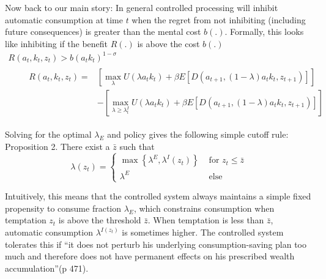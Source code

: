 \documentclass{article}
\begin{document}
Now back to our main story: In general controlled processing will inhibit automatic consumption at time $t$ when the regret from not inhibiting (including future consequences) is greater than the mental cost $b(.)$.  Formally, this looks like inhibiting if the benefit $R(.)$ is above the cost $b(.)$
\begin{equation*}
	\begin{array}{l}
	R\left(a_{t}, k_{t}, z_{t}\right)>b\left(a_{t} k_{t}\right)^{1-\sigma} \\
	\qquad \begin{aligned}
	R\left(a_{t}, k_{t}, z_{t}\right)=&\left[\max _{\lambda} U\left(\lambda a_{t} k_{t}\right)+\beta E\left[D\left(a_{t+1},(1-\lambda) a_{t} k_{t}, z_{t+1}\right)\right]\right] \\
	&-\left[\max _{\lambda \geqslant \lambda_{t}^{I}} U\left(\lambda a_{t} k_{t}\right)+\beta E\left[D\left(a_{t+1},(1-\lambda) a_{t} k_{t}, z_{t+1}\right)\right]\right]
	\end{aligned}
	\end{array}
	\end{equation*}

Solving for the optimal $\lambda_E$ and policy gives the following simple cutoff rule: 
Proposition
2. There exist a $\bar{z}$ such that
$$
\lambda\left(z_{t}\right)=\left\{\begin{array}{ll}
\max \left\{\lambda^{E}, \lambda^{I}\left(z_{t}\right)\right\} & \text { for } z_{t} \leqslant \bar{z} \\
\lambda^{E} & \text { else }
\end{array}\right.
$$

Intuitively, this means that the controlled system always maintains a simple fixed propensity to consume fraction $\lambda_E$, which constrains consumption when temptation $z_t$ is above the threshold $\bar{z}$. When temptation is less than $\bar{z}$, automatic consumption $\lambda^{I(z_t)}$ is sometimes higher. The controlled system tolerates this if ``it does not perturb his underlying consumption-saving plan too much and therefore does not have permanent effects on his prescribed wealth accumulation''(p 471).
\end{document}
